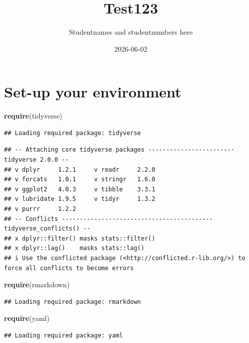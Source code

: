 \documentclass[
]{article}
\title{Test123}
\author{Studentnames and studentnumbers here}
\date{2026-06-02}
\newenvironment{Shaded}{\begin{snugshade}}{\end{snugshade}}
\newcommand{\FunctionTok}[1]{\textcolor[rgb]{0.13,0.29,0.53}{\textbf{#1}}}
\newcommand{\NormalTok}[1]{#1}
\begin{document}
\maketitle

\section{Set-up your environment}\label{set-up-your-environment}

\begin{Shaded}
\begin{Highlighting}[]
\FunctionTok{require}\NormalTok{(tidyverse)}
\end{Highlighting}
\end{Shaded}

\begin{verbatim}
## Loading required package: tidyverse
\end{verbatim}

\begin{verbatim}
## -- Attaching core tidyverse packages ------------------------ tidyverse 2.0.0 --
## v dplyr     1.2.1     v readr     2.2.0
## v forcats   1.0.1     v stringr   1.6.0
## v ggplot2   4.0.3     v tibble    3.3.1
## v lubridate 1.9.5     v tidyr     1.3.2
## v purrr     1.2.2     
## -- Conflicts ------------------------------------------ tidyverse_conflicts() --
## x dplyr::filter() masks stats::filter()
## x dplyr::lag()    masks stats::lag()
## i Use the conflicted package (<http://conflicted.r-lib.org/>) to force all conflicts to become errors
\end{verbatim}

\begin{Shaded}
\begin{Highlighting}[]
\FunctionTok{require}\NormalTok{(rmarkdown)}
\end{Highlighting}
\end{Shaded}

\begin{verbatim}
## Loading required package: rmarkdown
\end{verbatim}

\begin{Shaded}
\begin{Highlighting}[]
\FunctionTok{require}\NormalTok{(yaml)}
\end{Highlighting}
\end{Shaded}

\begin{verbatim}
## Loading required package: yaml
\end{verbatim}
\end{document}
